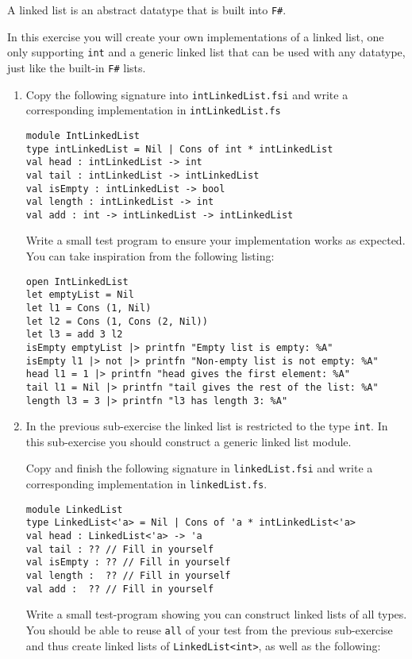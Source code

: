 A linked list is an abstract datatype that is built into \texttt{F\#}.

In this exercise you will create your own implementations of a linked list, one only supporting \texttt{int} and a generic linked list that can be used with any datatype, just like the built-in \texttt{F\#} lists.

\begin{enumerate}
\item Copy the following signature into \texttt{intLinkedList.fsi} and write a corresponding implementation in \texttt{intLinkedList.fs}
  \begin{lstlisting}
module IntLinkedList
type intLinkedList = Nil | Cons of int * intLinkedList
val head : intLinkedList -> int 
val tail : intLinkedList -> intLinkedList
val isEmpty : intLinkedList -> bool
val length : intLinkedList -> int
val add : int -> intLinkedList -> intLinkedList
\end{lstlisting}

Write a small test program to ensure your implementation works as expected.
You can take inspiration from the following listing:
\begin{lstlisting}
open IntLinkedList
let emptyList = Nil
let l1 = Cons (1, Nil)
let l2 = Cons (1, Cons (2, Nil))
let l3 = add 3 l2
isEmpty emptyList |> printfn "Empty list is empty: %A"
isEmpty l1 |> not |> printfn "Non-empty list is not empty: %A"
head l1 = 1 |> printfn "head gives the first element: %A"
tail l1 = Nil |> printfn "tail gives the rest of the list: %A"
length l3 = 3 |> printfn "l3 has length 3: %A"  
\end{lstlisting}

\item
  In the previous sub-exercise the linked list is restricted to the type \texttt{int}.
  In this sub-exercise you should construct a generic linked list module.\newline
  
  Copy and finish the following signature in \texttt{linkedList.fsi} and write a corresponding implementation in \texttt{linkedList.fs}. 
    \begin{lstlisting}
module LinkedList
type LinkedList<'a> = Nil | Cons of 'a * intLinkedList<'a>
val head : LinkedList<'a> -> 'a
val tail : ?? // Fill in yourself
val isEmpty : ?? // Fill in yourself
val length :  ?? // Fill in yourself
val add :  ?? // Fill in yourself
\end{lstlisting}

Write a small test-program showing you can construct linked lists of all types.
You should be able to reuse \texttt{all} of your test from the previous sub-exercise and thus create linked lists of \lstinline{LinkedList<int>}, as well as the following:


\end{enumerate}
